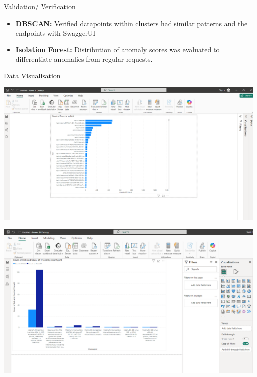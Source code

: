 \documentclass[10pt, a4paper]{beamer}
\begin{document}
	
	
	\begin{frame}
		\frametitle{}
		\begin{block}{Validation/ Verification}
			\begin{itemize}
				\item \textbf{DBSCAN:} Verified datapoints within clusters had similar patterns and the endpoints with SwaggerUI
				\item \textbf{Isolation Forest:} Distribution of anomaly scores was evaluated to differentiate anomalies from regular requests.
			\end{itemize}
		\end{block}
		
		\begin{block}{Data Visualization}
			
		\begin{minipage}{0.48\textwidth}
			\centering
			\includegraphics[width=\textwidth]{images/PowerBI_1.png}
		\end{minipage}
		\hfill
		\begin{minipage}{0.48\textwidth}
			\centering
			\includegraphics[width=\textwidth]{images/PowerBI_2.png}
		\end{minipage}
		
			\end{block}
		\end{frame}
	
\end{document}
